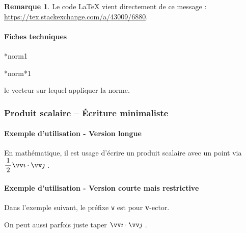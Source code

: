 \documentclass[12pt,a4paper]{article}
\makeatletter
\theoremstyle{definition}
\newtheorem*{remark}{Remarque}
\newcommand\IDmacro{\@ifstar{\@IDmacro@star}{\@IDmacro@no@star}}
\newcommand\@IDmacro@no@star[3]{%
    \texttt{%
    	\textbackslash#1%
    	\IfStrEq{#2}{0}{}{%
    		\,\,[#2 Option%
				\IfStrEq{#2}{1}{}{s}]%
			}%
	    \IfStrEq{#3}{}{}{%
	    		\,\,(#3 Argument%
				\IfStrEq{#3}{1}{}{s})%
			}
	   	}
    \immediate\write\tempfile{macro,#1,#2,#3}%
}
\newcommand\@IDmacro@star[2]{%
    \@IDmacro@no@star{#1}{0}{#2}%
}
\newcommand\@IDoptarg{\@ifstar{\@IDoptarg@star}{\@IDoptarg@no@star}}
\newcommand\@IDoptarg@star[2]{%
	\vspace{0.5em}
	\textbf{---} \texttt{#1%
		\IfStrEq{#2}{}{:}{\,#2:}%
	}%
}
\newcommand\@IDoptarg@no@star[2]{%
	\IfStrEq{#2}{}{%
		\@IDoptarg@star{#1}{}%
	}{%
		\@IDoptarg@star{#1}{#2}%
	}%
}
\newcommand\IDarg[1]{%
	\@IDoptarg{Argument}{#1}%
}
\makeatother
\begin{document}
\begin{remark}
	Le code \LaTeX{} vient directement de ce message : \url{https://tex.stackexchange.com/a/43009/6880}.
\end{remark}


            \paragraph{Fiches techniques}

\IDmacro*{norm}{1}

\IDmacro*{norm*}{1}

\IDarg{} le vecteur sur lequel appliquer la norme.






		\subsubsection{Produit scalaire -- Écriture minimaliste}

            \paragraph{Exemple d'utilisation - Version longue}

\begin{tcblisting}{}
En mathématique, il est usage d'écrire un produit scalaire avec un point via
$\dotprod{\dfrac{1}{2} \vect{i}}{\vect{j}}$ .
\end{tcblisting}


            \paragraph{Exemple d'utilisation - Version courte mais restrictive}

Dans l'exemple suivant, le préfixe \verb+v+ est pour \textbf{v}-ector.

\begin{tcblisting}{}
On peut aussi parfois juste taper $\vdotprod{i}{j}$ .
\end{tcblisting}
\end{document}
